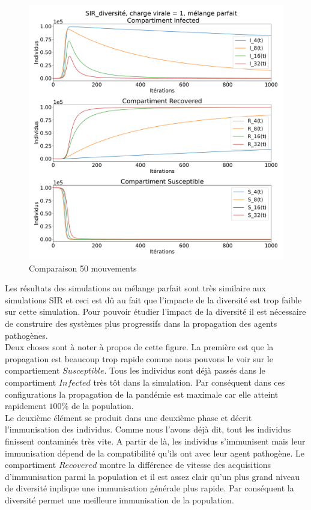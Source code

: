 \begin{figure}[h]
	\centering
	\captionsetup{justification=centering}
	\includegraphics[width=.7\textwidth]{Images/SIR_diversite_mix.pdf}
	\caption{Comparaison 50 mouvements}
\end{figure}

Les résultats des simulations au mélange parfait sont très similaire aux simulations SIR et ceci est dû au fait que l'impacte de la diversité est trop faible sur cette simulation. Pour pouvoir étudier l'impact de la diversité il est nécessaire de construire des systèmes plus progressifs dans la propagation des agents pathogènes.\\

Deux choses sont à noter à propos de cette figure. La première est que la propagation est beaucoup trop rapide comme nous pouvons le voir sur le compartiement $Susceptible$. Tous les individus sont déjà passés dans le compartiment $Infected$ très tôt dans la simulation. Par conséquent dans ces configurations la propagation de la pandémie est maximale car elle atteint rapidement $100\%$ de la population.\\

Le deuxième élément se produit dans une deuxième phase et décrit l'immunisation des individus. Comme nous l'avons déjà dit, tout les individus finissent contaminés très vite. A partir de là, les individus s'immunisent mais leur immunisation dépend de la compatibilité qu'ils ont avec leur agent pathogène. Le compartiment $Recovered$ montre la différence de vitesse des acquisitions d'immunisation parmi la population et il est assez clair qu'un plus grand niveau de diversité inplique une immunisation générale plus rapide. Par conséquent la diversité permet une meilleure immunisation de la population.

